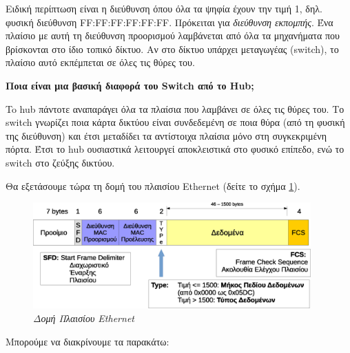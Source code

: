 Ειδική περίπτωση είναι η διεύθυνση όπου όλα τα ψηφία έχουν την τιμή 1, δηλ. φυσική διεύθυνση FF:FF:FF:FF:FF:FF. Πρόκειται για \emph{διεύθυνση εκπομπής}. Ένα πλαίσιο με αυτή τη διεύθυνση προορισμού λαμβάνεται από όλα τα μηχανήματα που βρίσκονται στο ίδιο τοπικό δίκτυο. Αν στο δίκτυο υπάρχει μεταγωγέας (switch), το πλαίσιο αυτό εκπέμπεται σε όλες τις θύρες του.

\begin{inthebox}
\textbf{Ποια είναι μια βασική διαφορά του Switch από το Hub;}

To hub πάντοτε αναπαράγει όλα τα πλαίσια που λαμβάνει σε όλες τις θύρες του. Το switch γνωρίζει ποια κάρτα δικτύου είναι συνδεδεμένη σε ποια θύρα (από τη φυσική της διεύθυνση) και έτσι μεταδίδει τα αντίστοιχα πλαίσια μόνο στη συγκεκριμένη πόρτα. Έτσι το hub ουσιαστικά λειτουργεί αποκλειστικά στο φυσικό επίπεδο, ενώ το switch στο ζεύξης δικτύου.\\
\end{inthebox}

Θα εξετάσουμε τώρα τη δομή του πλαισίου Ethernet (δείτε το σχήμα \ref{2-4}). 

\begin{figure}[!ht]
  \centering
  \includegraphics[width=0.95\textwidth]{images/chapter2/2-4}
  \caption {\textsl{Δομή Πλαισίου Ethernet}}
  \label{2-4}
\end{figure}

Μπορούμε να διακρίνουμε τα παρακάτω:

